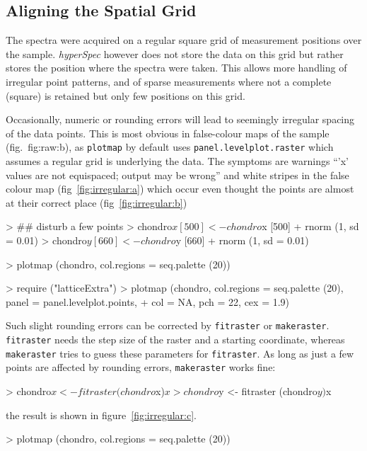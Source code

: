 \documentclass[english, a4paper, 10pt, headings=small, DIV11]{scrartcl}
\renewenvironment{Schunk}{\vspace{0pt}\begin{small}}{\end{small}\vspace{0pt}}
\newcommand{\Rcode}[2][]{\texorpdfstring{\nohyphens{#1\texttt{#2}}}{#2}}
\newcommand{\Rclass}[1]{\texorpdfstring{\nohyphens{\textit{#1}}}{#1}}
\newcommand{\chy}{\Rclass{hyperSpec}\xspace}
\begin{document}
\subsection{Aligning the Spatial Grid} 

The spectra were acquired on a regular square grid of measurement positions over the sample. \chy
however does not store the data on this grid but rather stores the position where the spectra were
taken. This allows more handling of irregular point patterns, and of sparse measurements where not a
complete (square) is retained but only few positions on this grid.

Occasionally, numeric or rounding errors will lead to seemingly irregular spacing of the data
points. This is most obvious in false-colour maps of the sample (fig.~{fig:raw:b}), as
\Rcode{plotmap} by default uses \Rcode{panel.levelplot.raster} which assumes a regular grid is
underlying the data. The symptoms are warnings ``'x' values are not equispaced; output may be wrong''
and white stripes in the false colour map (fig~\ref{fig:irregular:a}) which occur even thought the points are almost at their correct place (fig~\ref{fig:irregular:b})
\begin{Schunk}
\begin{Sinput}
> ## disturb a few points
> chondro$x [500] <- chondro$x [500] + rnorm (1, sd = 0.01)
> chondro$y [660] <- chondro$y [660] + rnorm (1, sd = 0.01)
\end{Sinput}
\end{Schunk}
\begin{Schunk}
\begin{Sinput}
> plotmap (chondro, col.regions = seq.palette (20))
\end{Sinput}
\end{Schunk}
\begin{Schunk}
\begin{Sinput}
> require ("latticeExtra")
> plotmap (chondro, col.regions = seq.palette (20), panel = panel.levelplot.points,
+          col = NA, pch = 22, cex = 1.9)
\end{Sinput}
\end{Schunk}

Such slight rounding errors can be corrected by \Rcode{fitraster} or \Rcode{makeraster}.
\Rcode{fitraster} needs the step size of the raster and a starting coordinate, whereas
\Rcode{makeraster} tries to guess these parameters for \Rcode{fitraster}. As long as just a few
points are affected by rounding errors, \Rcode{makeraster} works fine:
\begin{Schunk}
\begin{Sinput}
> chondro$x <- fitraster (chondro$x)$x
> chondro$y <- fitraster (chondro$y)$x
\end{Sinput}
\end{Schunk}
the result is shown in figure~\ref{fig:irregular:c}.
\begin{Schunk}
\begin{Sinput}
> plotmap (chondro, col.regions = seq.palette (20))
\end{Sinput}
\end{Schunk}
\end{document}
